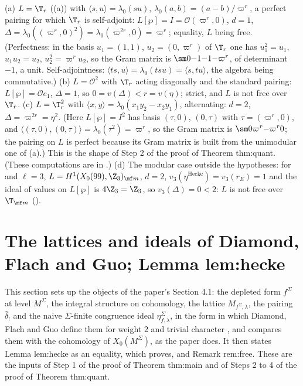 \begin{example}\label{ex:congruence:ddt417-checks}
(a) $L=\T_r$ ((a)) with $\langle s,u\rangle=\lambda_0(su)$, $\lambda_0(a,b)=(a-b)/\varpi^r$, a perfect pairing for which $\T_r$ is self-adjoint: $L[\wp]=I=\mathcal O(\varpi^r,0)$,
$d=1$, $\Delta=\lambda_0((\varpi^r,0)^2)=\lambda_0(\varpi^{2r},0)=\varpi^r$; equality, $L$ being free. (Perfectness: in the basis $u_1=(1,1)$, $u_2=(0,\varpi^r)$ of $\T_r$ one has $u_1^2=u_1$, $u_1u_2=u_2$,
$u_2^2=\varpi^ru_2$, so the Gram matrix is $\sm0{-1}{-1}{-\varpi^r}$, of determinant $-1$, a unit. Self-adjointness: $\langle ts,u\rangle=\lambda_0(tsu)=\langle s,tu\rangle$, the algebra being commutative.) (b) $L=\mathcal O^2$ with $\T_r$ acting diagonally and the standard pairing: $L[\wp]=\mathcal Oe_1$, $\Delta=1$, so $0=v(\Delta)<r=v(\eta)$;
strict, and $L$ is not free over $\T_r$. (c) $L=\T_r^2$ with $\langle x,y\rangle=\lambda_0(x_1y_2-x_2y_1)$, alternating: $d=2$, $\Delta=\varpi^{2r}=\eta^2$. (Here $L[\wp]=I^2$ has basis $(\tau,0)$, $(0,\tau)$ with $\tau=(\varpi^r,0)$, and
$\langle(\tau,0),(0,\tau)\rangle=\lambda_0(\tau^2)=\varpi^r$, so the Gram matrix is $\sm0{\varpi^r}{-\varpi^r}0$; the pairing on $L$ is perfect because its Gram matrix is built from the unimodular one of (a).) This is the shape of Step 2 of the proof
of Theorem thm:quant. (These computations are in .) (d) The modular case outside the hypotheses: for  and $\ell=3$, $L=H^1(X_0(99),\Z_3)_{\mf m}$, $d=2$,
$v_3(\eta^{\mathrm{Hecke}})=v_3(r_E)=1$ and the ideal of values on $L[\wp]$ is $4\Z_3=\Z_3$, so $v_3(\Delta)=0<2$: $L$ is not free over $\T_{\mf m}$ ().
\end{example}

\section[The lattices of Diamond, Flach and Guo; Lemma lem:hecke]{The lattices and ideals of Diamond, Flach and Guo; Lemma lem:hecke}\label{sec:congruence:dfg-lattices}

This section sets up the objects of the paper's Section 4.1: the depleted form $f^\Sigma$ at level $M^\Sigma$, the integral structure on cohomology, the lattice
$M_{f^\Sigma,\lambda}$, the pairing $\hat\delta_!$ and the naive $\Sigma$-finite congruence ideal $\eta^\Sigma_{f,\lambda}$, in the form in which Diamond, Flach and Guo define them for weight $2$
and trivial character \cite[Sections 1.5.3, 1.6.2, 1.7.3]{DFG04}, and compares them with the cohomology of $X_0(M^\Sigma)$, as the paper does. It then states Lemma lem:hecke
as an equality, which  proves, and Remark rem:free. These are the inputs of Step 1 of the proof of Theorem thm:main and of Steps 2 to 4 of the proof of
Theorem thm:quant.

